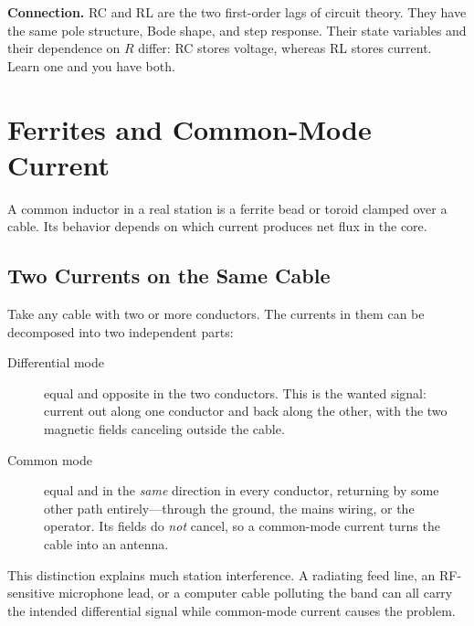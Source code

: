 \begin{controlsbox}
\textbf{Connection.} RC and RL are the two first-order lags of circuit theory.
They have the same pole structure, Bode shape, and step response. Their state
variables and their dependence on \(R\) differ: RC stores voltage, whereas RL
stores current.
Learn one and you have both.
\end{controlsbox}

\section{Ferrites and Common-Mode Current}
\label{sec:commonmode}
A common inductor in a real station is a ferrite bead or toroid clamped over a cable.
Its behavior depends on which current produces net flux in the core.

\subsection{Two Currents on the Same Cable}
Take any cable with two or more conductors. The currents in them can be decomposed
into two independent parts:
\begin{description}
\item[Differential mode] equal and opposite in the two conductors. This is the
wanted signal: current out along one conductor and back along the other, with the
two magnetic fields canceling outside the cable.
\item[Common mode] equal and in the \emph{same} direction in every conductor,
returning by some other path entirely---through the ground, the mains wiring, or the
operator. Its fields do \emph{not} cancel, so a common-mode current turns the cable
into an antenna.
\end{description}
This distinction explains much station interference. A radiating feed line, an RF-
sensitive microphone lead, or a computer cable polluting the band can all carry the
intended differential signal while common-mode current causes the problem.

